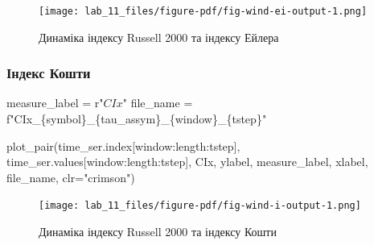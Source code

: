 \documentclass[
  letterpaper,
]{report}
\newenvironment{Shaded}{\begin{snugshade}}{\end{snugshade}}
\newcommand{\NormalTok}[1]{\textcolor[rgb]{0.00,0.23,0.31}{#1}}
\newcommand{\OperatorTok}[1]{\textcolor[rgb]{0.37,0.37,0.37}{#1}}
\newcommand{\SpecialCharTok}[1]{\textcolor[rgb]{0.37,0.37,0.37}{#1}}
\newcommand{\SpecialStringTok}[1]{\textcolor[rgb]{0.13,0.47,0.30}{#1}}
\newcommand{\StringTok}[1]{\textcolor[rgb]{0.13,0.47,0.30}{#1}}
\newcommand{\VerbatimStringTok}[1]{\textcolor[rgb]{0.13,0.47,0.30}{#1}}
\begin{document}
\begin{figure}[H]

{\centering \texttt{[image: lab\_11\_files/figure-pdf/fig-wind-ei-output-1.png]}

}

\caption{\label{fig-wind-ei}Динаміка індексу Russell 2000 та індексу
Ейлера}

\end{figure}

\hypertarget{ux456ux43dux434ux435ux43aux441-ux43aux43eux448ux442ux438}{%
\subsubsection{Індекс
Кошти}\label{ux456ux43dux434ux435ux43aux441-ux43aux43eux448ux442ux438}}

\begin{Shaded}
\begin{Highlighting}[]
\NormalTok{measure\_label }\OperatorTok{=} \VerbatimStringTok{r"$CIx$"}
\NormalTok{file\_name }\OperatorTok{=} \SpecialStringTok{f"CIx\_}\SpecialCharTok{\{}\NormalTok{symbol}\SpecialCharTok{\}}\SpecialStringTok{\_}\SpecialCharTok{\{}\NormalTok{tau\_assym}\SpecialCharTok{\}}\SpecialStringTok{\_}\SpecialCharTok{\{}\NormalTok{window}\SpecialCharTok{\}}\SpecialStringTok{\_}\SpecialCharTok{\{}\NormalTok{tstep}\SpecialCharTok{\}}\SpecialStringTok{"}
\end{Highlighting}
\end{Shaded}

\begin{Shaded}
\begin{Highlighting}[]
\NormalTok{plot\_pair(time\_ser.index[window:length:tstep],}
\NormalTok{          time\_ser.values[window:length:tstep],}
\NormalTok{          CIx, }
\NormalTok{          ylabel, }
\NormalTok{          measure\_label,}
\NormalTok{          xlabel,}
\NormalTok{          file\_name, }
\NormalTok{          clr}\OperatorTok{=}\StringTok{"crimson"}\NormalTok{)}
\end{Highlighting}
\end{Shaded}

\begin{figure}[H]

{\centering \texttt{[image: lab\_11\_files/figure-pdf/fig-wind-i-output-1.png]}

}

\caption{\label{fig-wind-сi}Динаміка індексу Russell 2000 та індексу
Кошти}

\end{figure}
\end{document}
